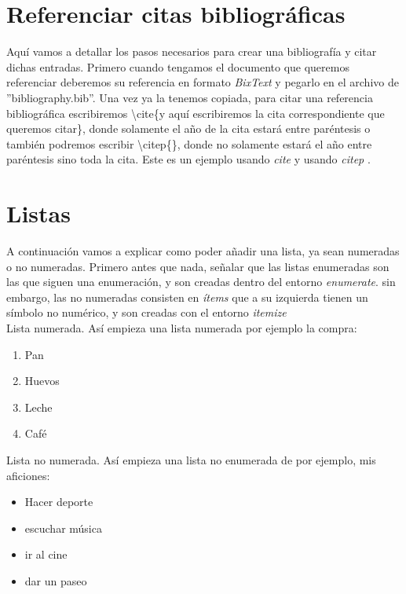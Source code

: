 \section{Referenciar citas bibliográficas}
 Aquí vamos a detallar los pasos necesarios para crear una bibliografía y citar dichas entradas. Primero cuando tengamos el documento que queremos referenciar deberemos su referencia en formato \textit{BixText} y pegarlo en el archivo de ''bibliography.bib''. Una vez ya la tenemos copiada, para citar una referencia bibliográfica escribiremos \textbackslash cite\{y aquí escribiremos la cita correspondiente que queremos citar\}, donde solamente el año de la cita estará entre paréntesis o también podremos escribir \textbackslash citep\{\}, donde no solamente estará el año entre paréntesis sino toda la cita. Este es un ejemplo usando \textit{cite} \cite{mota2018augmented} y usando \textit{citep} \citep{mota2018augmented}.




\section{Listas} 
A continuación vamos a explicar como poder añadir una lista, ya sean numeradas o no numeradas. Primero antes que nada, señalar que las listas enumeradas son las que siguen una enumeración, y son creadas dentro del entorno \textit{enumerate}. sin embargo, las no numeradas consisten en \textit{ítems} que a su izquierda tienen un símbolo no numérico, y son creadas con el entorno \textit{itemize}\\

 Lista numerada. Así empieza una lista numerada por ejemplo la compra:
    \begin{enumerate} 
     \item Pan
     \item Huevos
     \item Leche
     \item Café
 \end{enumerate} %
 
 Lista no numerada. Así empieza una lista no enumerada de por ejemplo, mis aficiones: 
 \begin{itemize} 
     \item Hacer deporte
     \item escuchar música
     \item ir al cine 
     \item dar un paseo 
 \end{itemize} %

